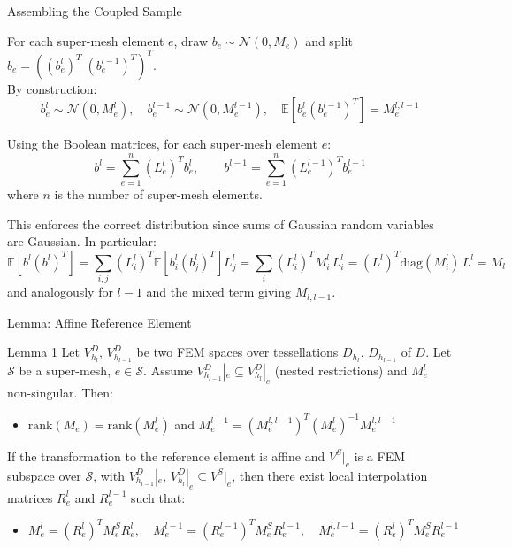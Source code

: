\documentclass[
  english,            %
  aspectratio=169,    %
]{tumbeamer}
\begin{document}

\begin{frame}{Assembling the Coupled Sample}

For each super-mesh element $e$, draw $b_e \sim \mathcal{N}(0, M_e)$ and split
$b_e = ((b_e^l)^T\; (b_e^{l-1})^T)^T$.  \\ By construction:
\begin{equation}
  b_e^l \sim \mathcal{N}(0, M_e^l),\quad
  b_e^{l-1} \sim \mathcal{N}(0, M_e^{l-1}),\quad
  \mathbb{E}[b_e^l (b_e^{l-1})^T] = M_e^{l,l-1}
\end{equation}

Using the Boolean matrices, for each super-mesh element $e$:
\begin{equation}
  b^l = \sum_{e=1}^n (L_e^l)^T b_e^l,
  \qquad
  b^{l-1} = \sum_{e=1}^n (L_e^{l-1})^T b_e^{l-1}
\end{equation}
where $n$ is the number of super-mesh elements.

This enforces the correct distribution since sums of Gaussian random variables are Gaussian.
In particular:
\begin{equation}
  \mathbb{E}[b^l (b^l)^T]
  = \sum_{i,j} (L_i^l)^T \mathbb{E}[b_i^l (b_j^l)^T] L_j^l
  = \sum_i (L_i^l)^T M_i^l\, L_i^l
  = (L^l)^T \mathrm{diag}(M_i^l)\, L^l = M_l
\end{equation}
and analogously for $l-1$ and the mixed term giving $M_{l,l-1}$.

\end{frame}


\begin{frame}{Lemma: Affine Reference Element}

\begin{block}{Lemma 1}
Let $V_{h_l}^D$, $V_{h_{l-1}}^D$ be two FEM spaces over tessellations $D_{h_l}$,
$D_{h_{l-1}}$ of $D$. Let $\mathcal{S}$ be a super-mesh, $e \in \mathcal{S}$.
Assume $V_{h_{l-1}}^D|_e \subseteq V_{h_l}^D|_e$ (nested restrictions) and $M_e^l$
non-singular. Then:
\begin{itemize}
  \item $\mathrm{rank}(M_e) = \mathrm{rank}(M_e^l)$ and
    $M_e^{l-1} = (M_e^{l,l-1})^T (M_e^l)^{-1} M_e^{l,l-1}$
\end{itemize}
If the transformation to the reference element is affine and $V^S|_e$ is a FEM subspace
over $\mathcal{S}$, with $V_{h_{l-1}}^D|_e,\, V_{h_l}^D|_e \subseteq V^S|_e$, then there
exist local interpolation matrices $R_e^l$ and $R_e^{l-1}$ such that:
\begin{itemize}
\item \begin{equation}
  M_e^l = (R_e^l)^T M_e^S R_e^l,\quad
  M_e^{l-1} = (R_e^{l-1})^T M_e^S R_e^{l-1},\quad
  M_e^{l,l-1} = (R_e^l)^T M_e^S R_e^{l-1}
\end{equation}
\end{itemize}
\end{block}

\end{frame}
\end{document}
